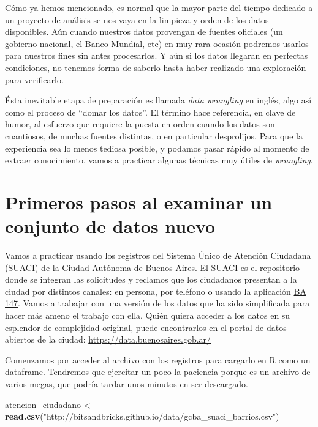 \documentclass[]{book}
\newenvironment{Shaded}{\begin{snugshade}}{\end{snugshade}}
\newcommand{\KeywordTok}[1]{\textcolor[rgb]{0.13,0.29,0.53}{\textbf{#1}}}
\newcommand{\StringTok}[1]{\textcolor[rgb]{0.31,0.60,0.02}{#1}}
\newcommand{\NormalTok}[1]{#1}
\begin{document}
Cómo ya hemos mencionado, es normal que la mayor parte del tiempo
dedicado a un proyecto de análisis se nos vaya en la limpieza y orden de
los datos disponibles. Aún cuando nuestros datos provengan de fuentes
oficiales (un gobierno nacional, el Banco Mundial, etc) en muy rara
ocasión podremos usarlos para nuestros fines sin antes procesarlos. Y
aún si los datos llegaran en perfectas condiciones, no tenemos forma de
saberlo hasta haber realizado una exploración para verificarlo.

Ésta inevitable etapa de preparación es llamada \emph{data wrangling} en
inglés, algo así como el proceso de ``domar los datos''. El término hace
referencia, en clave de humor, al esfuerzo que requiere la puesta en
orden cuando los datos son cuantiosos, de muchas fuentes distintas, o en
particular desprolijos. Para que la experiencia sea lo menos tediosa
posible, y podamos pasar rápido al momento de extraer conocimiento,
vamos a practicar algunas técnicas muy útiles de \emph{wrangling}.

\section{Primeros pasos al examinar un conjunto de datos
nuevo}\label{primeros-pasos-al-examinar-un-conjunto-de-datos-nuevo}

Vamos a practicar usando los registros del Sistema Único de Atención
Ciudadana (SUACI) de la Ciudad Autónoma de Buenos Aires. El SUACI es el
repositorio donde se integran las solicitudes y reclamos que los
ciudadanos presentan a la ciudad por distintos canales: en persona, por
teléfono o usando la aplicación
\href{https://gestioncolaborativa.buenosaires.gob.ar/prestaciones}{BA
147}. Vamos a trabajar con una versión de los datos que ha sido
simplificada para hacer más ameno el trabajo con ella. Quién quiera
acceder a los datos en su esplendor de complejidad original, puede
encontrarlos en el portal de datos abiertos de la ciudad:
\url{https://data.buenosaires.gob.ar/}

Comenzamos por acceder al archivo con los registros para cargarlo en R
como un dataframe. Tendremos que ejercitar un poco la paciencia porque
es un archivo de varios megas, que podría tardar unos minutos en ser
descargado.

\begin{Shaded}
\begin{Highlighting}[]
\NormalTok{atencion_ciudadano <-}\StringTok{ }\KeywordTok{read.csv}\NormalTok{(}\StringTok{"http://bitsandbricks.github.io/data/gcba_suaci_barrios.csv"}\NormalTok{)}
\end{Highlighting}
\end{Shaded}
\end{document}
